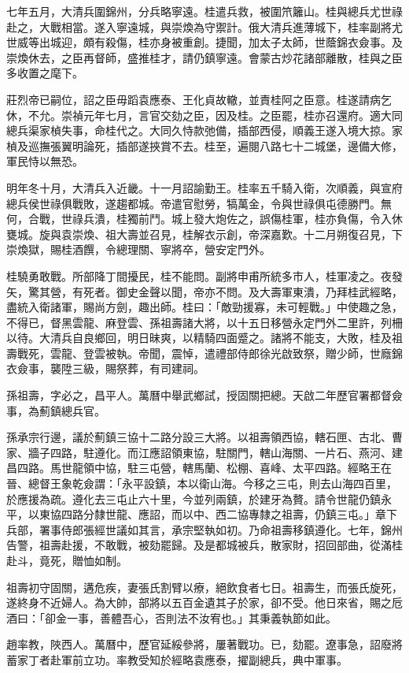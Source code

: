 \begin{pinyinscope}
七年五月，大清兵圍錦州，分兵略寧遠。桂遣兵救，被圍笊籬山。桂與總兵尤世祿赴之，大戰相當。遂入寧遠城，與崇煥為守禦計。俄大清兵進薄城下，桂率副將尤世威等出城迎，頗有殺傷，桂亦身被重創。捷聞，加太子太師，世蔭錦衣僉事。及崇煥休去，之臣再督師，盛推桂才，請仍鎮寧遠。會蒙古炒花諸部離散，桂與之臣多收置之麾下。

莊烈帝已嗣位，詔之臣毋蹈袁應泰、王化貞故轍，並責桂阿之臣意。桂遂請病乞休，不允。崇禎元年七月，言官交劾之臣，因及桂。之臣罷，桂亦召還府。適大同總兵渠家楨失事，命桂代之。大同久恃款弛備，插部西侵，順義王遂入境大掠。家楨及巡撫張翼明論死，插部遂挾賞不去。桂至，遍閱八路七十二城堡，邊備大修，軍民恃以無恐。

明年冬十月，大清兵入近畿。十一月詔諭勤王。桂率五千騎入衛，次順義，與宣府總兵侯世祿俱戰敗，遂趨都城。帝遣官慰勞，犒萬金，令與世祿俱屯德勝門。無何，合戰，世祿兵潰，桂獨前鬥。城上發大炮佐之，誤傷桂軍，桂亦負傷，令入休甕城。旋與袁崇煥、祖大壽並召見，桂解衣示創，帝深嘉歎。十二月朔復召見，下崇煥獄，賜桂酒饌，令總理關、寧將卒，營安定門外。

桂驍勇敢戰。所部降丁間擾民，桂不能問。副將申甫所統多市人，桂軍凌之。夜發矢，驚其營，有死者。御史金聲以聞，帝亦不問。及大壽軍東潰，乃拜桂武經略，盡統入衛諸軍，賜尚方劍，趣出師。桂曰：「敵勁援寡，未可輕戰。」中使趣之急，不得已，督黑雲龍、麻登雲、孫祖壽諸大將，以十五日移營永定門外二里許，列柵以待。大清兵自良鄉回，明日昧爽，以精騎四面蹙之。諸將不能支，大敗，桂及祖壽戰死，雲龍、登雲被執。帝聞，震悼，遣禮部侍郎徐光啟致祭，贈少師，世廕錦衣僉事，襲陞三級，賜祭葬，有司建祠。

孫祖壽，字必之，昌平人。萬曆中舉武鄉試，授固關把總。天啟二年歷官署都督僉事，為薊鎮總兵官。

孫承宗行邊，議於薊鎮三協十二路分設三大將。以祖壽領西協，轄石匣、古北、曹家、牆子四路，駐遵化。而江應詔領東協，駐關門，轄山海關、一片石、燕河、建昌四路。馬世龍領中協，駐三屯營，轄馬蘭、松棚、喜峰、太平四路。經略王在晉、總督王象乾僉謂：「永平設鎮，本以衛山海。今移之三屯，則去山海四百里，於應援為疏。遵化去三屯止六十里，今並列兩鎮，於建牙為贅。請令世龍仍鎮永平，以東協四路分隸世龍、應詔，而以中、西二協專隸之祖壽，仍鎮三屯。」章下兵部，署事侍郎張經世議如其言，承宗堅執如初。乃命祖壽移鎮遵化。七年，錦州告警，祖壽赴援，不敢戰，被劾罷歸。及是都城被兵，散家財，招回部曲，從滿桂赴斗，竟死，贈恤如制。

祖壽初守固關，遘危疾，妻張氏割臂以療，絕飲食者七日。祖壽生，而張氏旋死，遂終身不近婦人。為大帥，部將以五百金遺其子於家，卻不受。他日來省，賜之卮酒曰：「卻金一事，善體吾心，否則法不汝宥也。」其秉義執節如此。

趙率教，陜西人。萬曆中，歷官延綏參將，屢著戰功。已，劾罷。遼事急，詔廢將蓄家丁者赴軍前立功。率教受知於經略袁應泰，擢副總兵，典中軍事。


\end{pinyinscope}

